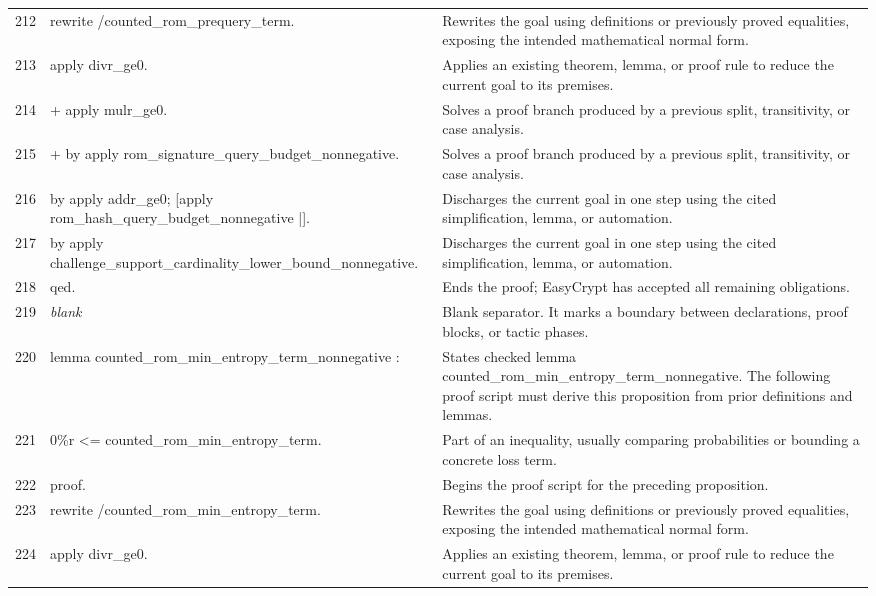 \documentclass[10pt]{article}
\begin{document}
\begin{longtable}{r L{0.53\textwidth} L{0.37\textwidth}}
212 & {\ttfamily\scriptsize rewrite /counted\_rom\_prequery\_term.} & Rewrites the goal using definitions or previously proved equalities, exposing the intended mathematical normal form. \\
213 & {\ttfamily\scriptsize apply divr\_ge0.} & Applies an existing theorem, lemma, or proof rule to reduce the current goal to its premises. \\
214 & {\ttfamily\scriptsize + apply mulr\_ge0.} & Solves a proof branch produced by a previous split, transitivity, or case analysis. \\
215 & {\ttfamily\scriptsize   + by apply rom\_signature\_query\_budget\_nonnegative.} & Solves a proof branch produced by a previous split, transitivity, or case analysis. \\
216 & {\ttfamily\scriptsize   by apply addr\_ge0; [apply rom\_hash\_query\_budget\_nonnegative |].} & Discharges the current goal in one step using the cited simplification, lemma, or automation. \\
217 & {\ttfamily\scriptsize by apply challenge\_support\_cardinality\_lower\_bound\_nonnegative.} & Discharges the current goal in one step using the cited simplification, lemma, or automation. \\
218 & {\ttfamily\scriptsize qed.} & Ends the proof; EasyCrypt has accepted all remaining obligations. \\
219 & {\ttfamily\scriptsize \emph{blank}} & Blank separator.  It marks a boundary between declarations, proof blocks, or tactic phases. \\
220 & {\ttfamily\scriptsize lemma counted\_rom\_min\_entropy\_term\_nonnegative :} & States checked lemma counted\_rom\_min\_entropy\_term\_nonnegative.  The following proof script must derive this proposition from prior definitions and lemmas. \\
221 & {\ttfamily\scriptsize   0\%r <= counted\_rom\_min\_entropy\_term.} & Part of an inequality, usually comparing probabilities or bounding a concrete loss term. \\
222 & {\ttfamily\scriptsize proof.} & Begins the proof script for the preceding proposition. \\
223 & {\ttfamily\scriptsize rewrite /counted\_rom\_min\_entropy\_term.} & Rewrites the goal using definitions or previously proved equalities, exposing the intended mathematical normal form. \\
224 & {\ttfamily\scriptsize apply divr\_ge0.} & Applies an existing theorem, lemma, or proof rule to reduce the current goal to its premises. \\

\end{longtable}
\end{document}
